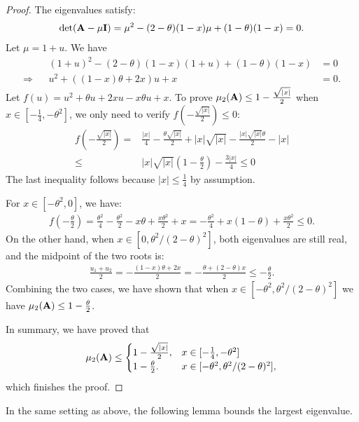 \begin{proof}
The eigenvalues satisfy:
\begin{align*}
\text{det} (\mathbf{A} - \mu \mathbf{I}) = \mu^2 - (2-\theta)(1-x)\mu + (1-\theta)(1-x) = 0.
\end{align*}
Let $\mu = 1+u$.  We have 
\begin{align*}
&& (1+u)^2 - (2-\theta)(1-x)(1+u) + (1-\theta)(1-x) &= 0 \\
\Rightarrow  && u^2 +  ((1-x)\theta + 2x) u + x&= 0.
\end{align*}
Let $f(u) = u^2 + \theta u + 2xu - x\theta u + x$.  
To prove $\mu_2(\mathbf{A}) \le 1 - \frac{\sqrt{|x|}}{2}$ 
when $x\in [-\frac{1}{4}, -\theta^2]$, we only need to verify $f(-\frac{\sqrt{|x|}}{2}) \le 0$:
\begin{align*}
f(-\frac{\sqrt{|x|}}{2}) = &\frac{|x|}{4} - \frac{\theta\sqrt{|x|}}{2}
+ |x|\sqrt{|x|} - \frac{|x|\sqrt{|x|}\theta}{2} - |x| \\
\le & |x|\sqrt{|x|}(1-\frac{\theta}{2}) - \frac{3|x|}{4} \le 0
\end{align*}
The last inequality follows because $|x| \le \frac{1}{4}$ by assumption.

For $x\in [-\theta^2, 0]$, we have:
\begin{align*}
f(-\frac{\theta}{2}) = \frac{\theta^2}{4} -\frac{\theta^2}{2} - x\theta
+ \frac{x\theta^2}{2} + x
= -\frac{\theta^2}{4} + x(1-\theta) + \frac{x\theta^2}{2} \le 0.
\end{align*}
On the other hand, when $x \in [0, \theta^2/(2-\theta)^2]$, both 
eigenvalues are still real, and the midpoint of the two roots is:
\begin{align*}
\frac{u_1 + u_2}{2} = -\frac{(1-x)\theta + 2x}{2}
=-\frac{\theta + (2-\theta)x}{2}
\le -\frac{\theta}{2}.
\end{align*}
Combining the two cases, we have shown that when 
$x \in [-\theta^2, \theta^2/(2-\theta)^2]$ we have 
$\mu_2 (\mathbf{A}) \le 1-\frac{\theta}{2}$.

In summary, we have proved that
\begin{equation*}
\mu_2(\mathbf{A}) \le 
\begin{cases}
1 - \frac{\sqrt{|x|}}{2}, & x \in  [-\frac{1}{4}, -\theta^2]\\
1-\frac{\theta}{2}.& x \in  [-\theta^2, \theta^2/(2-\theta)^2],
\end{cases}
\end{equation*}
which finishes the proof.
\end{proof}
\noindent
In the same setting as above, the following lemma bounds the largest eigenvalue.
